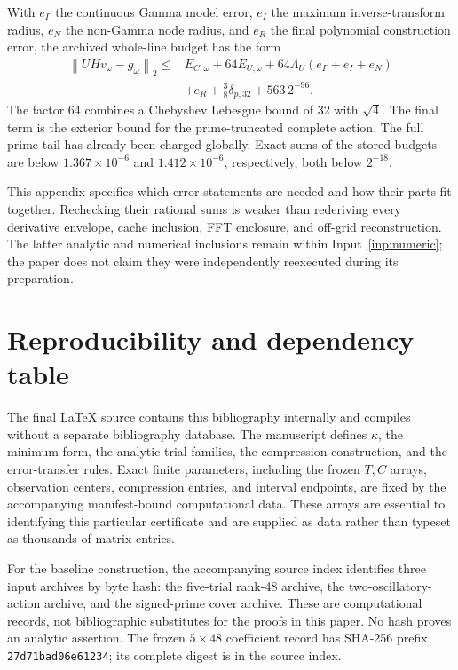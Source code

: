 \documentclass[11pt,a4paper]{article}
\numberwithin{equation}{section}
\theoremstyle{definition}\newtheorem{definition}[theorem]{Definition}
\theoremstyle{remark}\newtheorem{remark}[theorem]{Remark}
\newcommand{\norm}[1]{\left\|#1\right\|}
\begin{document}
With $e_\Gamma$ the continuous Gamma model error, $e_I$ the maximum inverse-transform radius, $e_N$ the non-Gamma node radius, and $e_R$ the final polynomial construction error, the archived whole-line budget has the form
\begin{align}\label{eq:actionbudget}
 \norm{UH v_\omega-g_\omega}_2\le{}&E_{C,\omega}+64E_{U,\omega}
 +64\Lambda_U(e_\Gamma+e_I+e_N)\nonumber\\
 &+e_R+\tfrac38\delta_{p,32}+563\,2^{-96}.
\end{align}
The factor 64 combines a Chebyshev Lebesgue bound of 32 with $\sqrt4$. The final term is the exterior bound for the prime-truncated complete action. The full prime tail has already been charged globally. Exact sums of the stored budgets are below $1.367\times10^{-6}$ and $1.412\times10^{-6}$, respectively, both below $2^{-18}$.

This appendix specifies which error statements are needed and how their parts fit together. Rechecking their rational sums is weaker than rederiving every derivative envelope, cache inclusion, FFT enclosure, and off-grid reconstruction. The latter analytic and numerical inclusions remain within Input~\ref{inp:numeric}; the paper does not claim they were independently reexecuted during its preparation.

\section{Reproducibility and dependency table}\label{app:repro}
The final \LaTeX{} source contains this bibliography internally and compiles without a separate bibliography database. The manuscript defines $\kappa$, the minimum form, the analytic trial families, the compression construction, and the error-transfer rules. Exact finite parameters, including the frozen $T,C$ arrays, observation centers, compression entries, and interval endpoints, are fixed by the accompanying manifest-bound computational data. These arrays are essential to identifying this particular certificate and are supplied as data rather than typeset as thousands of matrix entries.

For the baseline construction, the accompanying source index identifies three input archives by byte hash: the five-trial rank-48 archive, the two-oscillatory-action archive, and the signed-prime cover archive. These are computational records, not bibliographic substitutes for the proofs in this paper. No hash proves an analytic assertion. The frozen $5\times48$ coefficient record has SHA-256 prefix \texttt{27d71bad06e61234}; its complete digest is in the source index.
\end{document}
